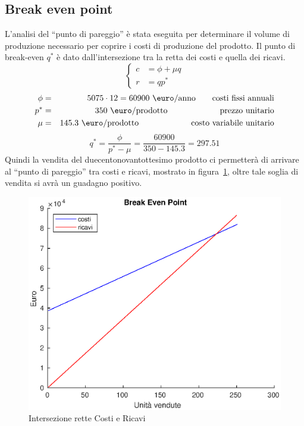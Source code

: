 \subsection{Break even point}
L’analisi del “punto di pareggio” è stata eseguita per determinare il volume di
produzione necessario per coprire i costi di produzione del prodotto.  Il punto
di break-even $q^*$ è dato dall’intersezione tra la retta dei costi e quella dei
ricavi. 
%
\setlength\arraycolsep{2pt}
\begin{displaymath}
\left\{ \begin{array}{rl}
c &= \phi + \mu q \\
r &= q p^* 
\end{array} \right .
\end{displaymath}
%
\begin{eqnarray*}
\phi &=& 5075 \cdot 12 = 60900 \ \mbox{\euro/anno} \qquad \mbox{costi fissi annuali} \\
p^* &=& 350 \ \mbox{\euro/prodotto} \ \qquad\quad\qquad\quad \mbox{prezzo
unitario} \\
\mu &=& 145.3 \ \mbox{\euro/prodotto} \ \qquad\quad\qquad\quad \mbox{costo variabile unitario}
\end{eqnarray*}
%
\begin{displaymath}
q^* = \frac{\phi}{p^* - \mu} = \frac{60900}{350 - 145.3} = 297.51 
\end{displaymath}
Quindi la vendita del duecentonovantottesimo prodotto ci permetterà di
arrivare al “punto di pareggio” tra costi e ricavi, mostrato in
figura~\ref{bep}, oltre tale soglia di vendita si avrà un guadagno positivo.
%
\begin{figure}[!h]
\centering
\includegraphics[width=\textwidth]{figures/bep}
\caption{Intersezione rette Costi e Ricavi}
\label{bep}
\end{figure}
%
